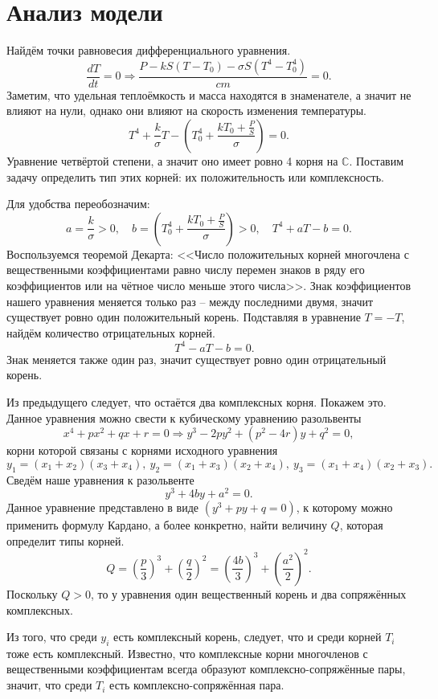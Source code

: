 \section{Анализ модели}
    Найдём точки равновесия дифференциального уравнения.
    \[
        \frac{dT}{dt} = 0 \Rightarrow  \frac{P - k S (T - T_0) - \sigma S (T^4 - T_0^4)}{cm} = 0.
    \]
    Заметим, что удельная теплоёмкость и масса находятся в знаменателе, а значит не влияют на нули, однако они влияют на скорость изменения температуры.
    \[
        T^4 + \frac{k}{\sigma} T - \left( T_0^4 + \frac{k T_0 + \frac{P}{S}}{\sigma} \right) = 0.
    \]
    Уравнение четвёртой степени, а значит оно имеет ровно 4 корня на \(\mathbb{C}\). Поставим задачу определить тип этих корней: их положительность или комплексность.
    
    Для удобства переобозначим: 
    \[
            a = \frac{k}{\sigma} > 0, \quad b = \left( T_0^4 + \frac{k T_0 + \frac{P}{S}}{\sigma} \right) > 0, \quad T^4 + a T - b = 0.
    \]
    Воспользуемся теоремой Декарта: <<Число положительных корней многочлена с вещественными коэффициентами равно числу перемен знаков в ряду его коэффициентов или на чётное число меньше этого числа>>. Знак коэффициентов нашего уравнения меняется только раз -- между последними двумя, значит существует ровно один положительный корень. Подставляя в уравнение $ T = -T $, найдём количество отрицательных корней. 
    \[ \quad T^4 - a T - b = 0. \]
    Знак меняется также один раз, значит существует ровно один отрицательный корень.

    Из предыдущего следует, что остаётся два комплексных корня. Покажем это. Данное уравнения можно свести к кубическому уравнению разольвенты
    \[
        x^4 + px^2 + qx + r = 0 \Rightarrow y^3 -2py^2 + (p^2 - 4r)y + q^2 = 0,
    \]
    корни которой связаны с корнями исходного уравнения
    \[
        y_1 = (x_1 + x_2)(x_3+x_4), ~ y_2 = (x_1 + x_3)(x_2+x_4), ~ y_3 = (x_1 + x_4)(x_2+x_3).
    \]
    Сведём наше уравнения к разольвенте
    \[
        y^3 + 4by + a^2 = 0.
    \]
    Данное уравнение представлено в виде $(y^3 + py + q = 0)$, к которому можно применить формулу Кардано, а более конкретно, найти величину $ Q $, которая определит типы корней.
    \[
        Q = \left( \frac{p}{3} \right)^3 + \left( \frac{q}{2} \right)^2 = \left( \frac{4b}{3} \right)^3 + \left( \frac{a^2}{2} \right)^2.
    \]
    Поскольку $Q > 0$, то у уравнения один вещественный корень и два сопряжённых комплексных. 

    Из того, что среди $ y_i $ есть комплексный корень, следует, что и среди корней $ T_i $ тоже есть комплексный. Известно, что комплексные корни многочленов с вещественными коэффициентам всегда образуют комплексно-сопряжённые пары, значит, что среди $ T_i $ есть комплексно-сопряжённая пара.

